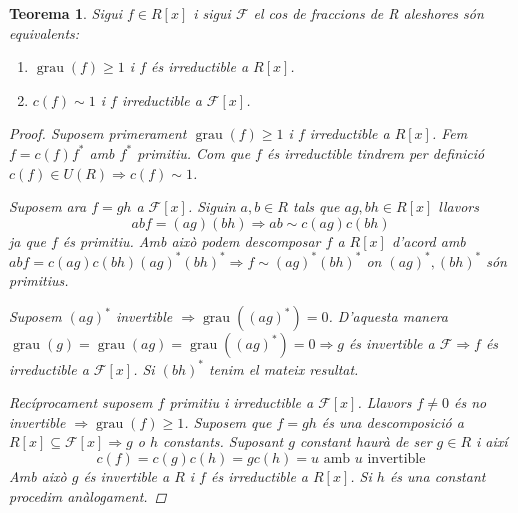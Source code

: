 \documentclass[a4paper,11pt]{report}
\newcommand{\pr}{^*}
\DeclareMathOperator{\grau}{grau}
\newcommand{\fra}{\mathcal{F}}
\newcommand{\im}{\Rightarrow}
\theoremstyle{theorem}
\newtheorem{teorema}{\normalfont \sffamily\bfseries Teorema}[section]
\theoremstyle{definition}
\begin{document}
\begin{teorema}
	Sigui $f\in R[x]$ i sigui $\mathcal{F}$ el cos de fraccions de R aleshores són equivalents:\begin{enumerate}
		\item $\grau(f)\geq 1$ i $f$ és irreductible a $R[x]$.\item $c(f)\sim 1$ i $f$ irreductible a $\mathcal{F}[x]$.
	\end{enumerate}
\begin{proof}
	Suposem primerament $\grau(f)\geq 1$ i $f$ irreductible a $R[x]$. Fem $f=c(f)f^*$ amb $f^*$ primitiu. Com que $f$ és irreductible tindrem per definició $c(f)\in U(R)\im c(f)\sim 1$. 
	
	Suposem ara $f=gh$ a $\mathcal{F}[x]$. Siguin $a,b\in R$ tals que $ag,bh\in R[x]$ llavors $$abf=(ag)(bh)\im ab\sim c(ag)c(bh)$$ ja que  $f$ és primitiu. Amb això podem descomposar $f$ a $R[x]$ d'acord amb $ab f=c(ag)c(bh)(ag)^*(bh)^*\im f\sim (ag)^*(bh)^*$ on $(ag)^*,(bh)^*$ són primitius. 
	
	Suposem $(ag)^*$ invertible $\im\grau((ag)\pr)=0$. D'aquesta manera $\grau(g)=\grau(ag)=\grau((ag)\pr)=0\im g$ és invertible a $\fra\im f$ és irreductible a $\fra[x]$. Si $(bh)\pr$ tenim el mateix resultat.
	
	Recíprocament suposem $f$ primitiu i irreductible a $\fra[x]$. Llavors $f\neq 0$ és no invertible $\im\grau(f)\geq 1$. Suposem que $f=gh$ és una descomposició a $R[x]\subseteq \fra[x]\im g$ o $h$ constants. Suposant $g$ constant haurà de ser $g\in R$ i així $$c(f)=c(g)c(h)=gc(h)=u \text{ amb } u\text{ invertible}$$
	Amb això $g$ és invertible a $R$ i $f$ és irreductible a $R[x]$. Si $h$ és una constant procedim anàlogament.
	\end{proof}
\end{teorema}
\end{document}
